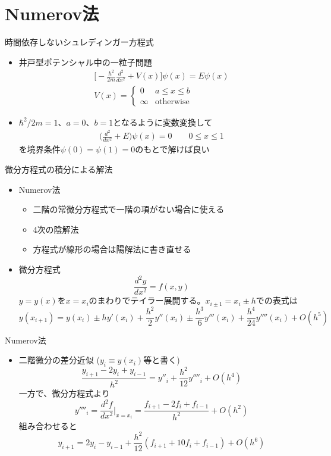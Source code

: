 \section{Numerov法}

\begin{frame}[t,fragile]{時間依存しないシュレディンガー方程式}
  \begin{itemize}
    \setlength{\itemsep}{1em}
  \item 井戸型ポテンシャル中の一粒子問題
    \begin{align*}
      \big[ -\frac{\hbar^2}{2m}\frac{d^2}{dx^2} + V(x) \big] \psi(x) = E \psi(x) \\
      V(x) = \begin{cases}
        0 & \text{$a \le x \le b$} \\ \infty & \text{otherwise}
      \end{cases}
    \end{align*}
  \item $\hbar^2/2m = 1$、$a=0$、$b=1$となるように変数変換して
    \begin{align*}
      \big( \frac{d^2}{dx^2} + E \big) \psi(x) = 0 \qquad 0 \le x \le 1
    \end{align*}
    を境界条件$\psi(0) = \psi(1) = 0$のもとで解けば良い
  \end{itemize}
\end{frame}

\begin{frame}[t,fragile]{微分方程式の積分による解法}
  \begin{itemize}
    \setlength{\itemsep}{1em}
  \item Numerov法
    \begin{itemize}
    \item 二階の常微分方程式で一階の項がない場合に使える
    \item 4次の陰解法
    \item 方程式が線形の場合は陽解法に書き直せる
    \end{itemize}
  \item 微分方程式
    \[
    \frac{d^2y}{dx^2} = f(x,y)
    \]
  $y=y(x)$を$x=x_i$のまわりでテイラー展開する。$x_{i \pm 1} = x_i \pm h$での表式は
      \[
      y(x_{i+1}) = y(x_i) \pm h y'(x_i) + \frac{h^2}{2} y''(x_i) \pm \frac{h^3}{6} y'''(x_i) + \frac{h^4}{24} y''''(x_i)  + O(h^5)
      \]
  \end{itemize}
\end{frame}

\begin{frame}[t,fragile]{Numerov法}
  \begin{itemize}
    \setlength{\itemsep}{1em}
  \item 二階微分の差分近似 ($y_i \equiv y(x_i)$等と書く)
    \[
    \frac{y_{i+1} - 2 y_i + y_{i-1}}{h^2} = y''_{i} + \frac{h^2}{12} y''''_{i} + O(h^4)
    \]
  一方で、微分方程式より
    \[
    y''''_i = \frac{d^2f}{dx^2}\Big|_{x=x_i} = \frac{f_{i+1}-2f_i+f_{i-1}}{h^2} + O(h^2)
    \]
    組み合わせると
    \[
    y_{i+1} = 2y_i - y_{i-1} + \frac{h^2}{12} (f_{i+1} + 10f_{i} + f_{i-1}) + O(h^6)
    \]
  \end{itemize}
\end{frame}

